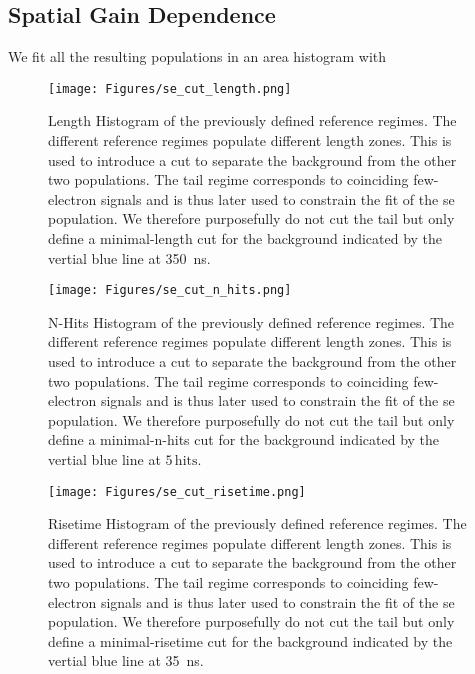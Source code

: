 
\FloatBarrier
\subsection{Spatial Gain Dependence}
\label{ssec:g2}
\FloatBarrier

We fit all the resulting populations in an area histogram with %

\begin{figure}
    \centering
    \texttt{[image: Figures/se\_cut\_length.png]}  %
    \caption[Length Histogramm and Cut for SEs]{
        Length Histogram of the previously defined reference regimes.
        The different reference regimes populate different length zones.
        This is used to introduce a cut to separate the background from the other two populations.
        The tail regime corresponds to coinciding few-electron signals and is thus later used to constrain the fit of the \gls{se} population.
        We therefore purposefully do not cut the tail but only define a minimal-length cut for the background indicated by the vertial blue line at \SI{350}{\nano\second}.
    }
    \label{fig:len-cut-se}
\end{figure}


\begin{figure}
    \centering
    \texttt{[image: Figures/se\_cut\_n\_hits.png]}  %
    \caption[N-Hits Histogramm and Cut for SEs]{
        N-Hits Histogram of the previously defined reference regimes.
        The different reference regimes populate different length zones.
        This is used to introduce a cut to separate the background from the other two populations.
        The tail regime corresponds to coinciding few-electron signals and is thus later used to constrain the fit of the \gls{se} population.
        We therefore purposefully do not cut the tail but only define a minimal-n-hits cut for the background indicated by the vertial blue line at $ 5\,\mathrm{hits} $.
    }
    \label{fig:hit-cut-se}
\end{figure}


\begin{figure}
    \centering
    \texttt{[image: Figures/se\_cut\_risetime.png]}  %
    \caption[Risetime Histogramm and Cut for SEs]{
        Risetime Histogram of the previously defined reference regimes.
        The different reference regimes populate different length zones.
        This is used to introduce a cut to separate the background from the other two populations.
        The tail regime corresponds to coinciding few-electron signals and is thus later used to constrain the fit of the \gls{se} population.
        We therefore purposefully do not cut the tail but only define a minimal-risetime cut for the background indicated by the vertial blue line at \SI{35}{\nano\second}.
    }
    \label{fig:riset-cut-se}
\end{figure}


